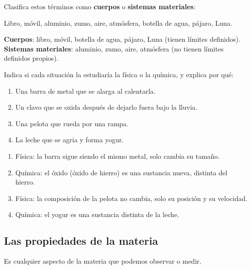 \begin{exercise}
    Clasifica estos términos como \textbf{cuerpos} o \textbf{sistemas materiales}:

    Libro, móvil, aluminio, zumo, aire, atmósfera, botella de agua, pájaro, Luna.
    \begin{solu}
        \textbf{Cuerpos}: libro, móvil, botella de agua, pájaro, Luna (tienen límites definidos). \\
        \textbf{Sistemas materiales}: aluminio, zumo, aire, atmósfera (no tienen límites definidos propios).
    \end{solu}
\end{exercise}

\begin{exercise}
    Indica si cada situación la estudiaría la física o la química, y explica por qué:
    \begin{enumerate}[label=\letraminuscula]
        \item Una barra de metal que se alarga al calentarla.
        \item Un clavo que se oxida después de dejarlo fuera bajo la lluvia.
        \item Una pelota que rueda por una rampa.
        \item La leche que se agria y forma yogur.
    \end{enumerate}
    \begin{solu}
        \begin{enumerate}[label=\alph*)]
            \item Física: la barra sigue siendo el mismo metal, solo cambia su tamaño.
            \item Química: el óxido (óxido de hierro) es una sustancia nueva, distinta del hierro.
            \item Física: la composición de la pelota no cambia, solo su posición y su velocidad.
            \item Química: el yogur es una sustancia distinta de la leche.
        \end{enumerate}
    \end{solu}
\end{exercise}

\subsection{Las propiedades de la materia}

\begin{definition}
    Es cualquier aspecto de la materia que podemos observar o medir.
\end{definition}

